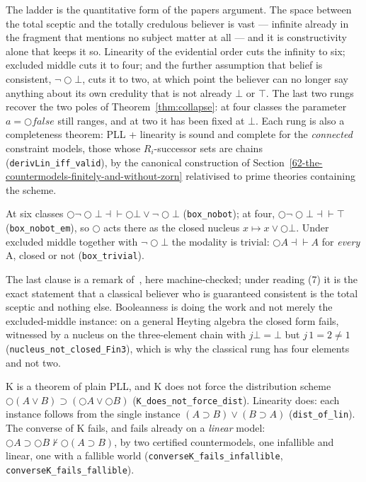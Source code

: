 The ladder is the quantitative form of the paper\textquotesingle s
argument. The space between the total sceptic and the totally credulous
believer is vast --- infinite already in the fragment that mentions no
subject matter at all --- and it is constructivity alone that keeps it
so. Linearity of the evidential order cuts the infinity to six;
excluded middle cuts it to four; and the further assumption that belief
is consistent, \ensuremath{\lnot\bigcirc\bot}, cuts it to two, at which
point the believer can no longer say anything about its own credulity
that is not already \ensuremath{\bot} or \ensuremath{\top}. The last two
rungs recover the two poles of Theorem~\ref{thm:collapse}: at four
classes the parameter \ensuremath{a = \bigcirc\mathit{false}} still
ranges, and at two it has been fixed at \ensuremath{\bot}. Each rung is
also a completeness theorem: PLL + linearity is sound and complete for
the \emph{connected} constraint models, those whose
\ensuremath{R_{i}}-successor sets are chains
(\texttt{derivLin\_iff\_valid}), by the canonical construction of
Section~\ref{62-the-countermodels-finitely-and-without-zorn} relativised
to prime theories containing the scheme.

\begin{proposition}\label{prop:rungs}
At six classes \ensuremath{\bigcirc\lnot\bigcirc\bot \dashv\vdash \bigcirc\bot \vee \lnot\bigcirc\bot}
(\texttt{box\_nobot}); at four,
\ensuremath{\bigcirc\lnot\bigcirc\bot \dashv\vdash \top}
(\texttt{box\_nobot\_em}), so \ensuremath{\bigcirc} acts there as the closed
nucleus \ensuremath{x \mapsto x \vee \bigcirc\bot}. Under excluded middle
together with \ensuremath{\lnot\bigcirc\bot} the modality is trivial:
\ensuremath{\bigcirc A \dashv\vdash A} for \emph{every} A, closed or not
(\texttt{box\_trivial}).
\end{proposition}

The last clause is a remark of~\cite[p.~6]{FairtloughMendler1997}, here
machine-checked; under reading (7) it is the exact statement that a
classical believer who is guaranteed consistent is the total sceptic and
nothing else. Booleanness is doing the work and not merely the
excluded-middle instance: on a general Heyting algebra the closed form
fails, witnessed by a nucleus on the three-element chain with
\ensuremath{j\bot = \bot} but \ensuremath{j\,1 = 2 \neq 1}
(\texttt{nucleus\_not\_closed\_Fin3}), which is why the classical rung
has four elements and not two.

\begin{proposition}\label{prop:dist}
K is a theorem of plain PLL, and K does not force the distribution
scheme \ensuremath{\bigcirc(A \vee B) \supset (\bigcirc A \vee \bigcirc B)}
(\texttt{K\_does\_not\_force\_dist}). Linearity does: each instance follows
from the single instance \ensuremath{(A \supset B) \vee (B \supset A)}
(\texttt{dist\_of\_lin}). The converse of K fails, and fails already on a
\emph{linear} model: \ensuremath{\bigcirc A \supset \bigcirc B \nvdash \bigcirc(A \supset B)},
by two certified countermodels, one infallible and linear, one with a
fallible world (\texttt{converseK\_fails\_infallible},
\texttt{converseK\_fails\_fallible}).
\end{proposition}


